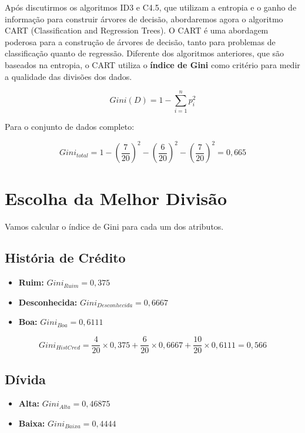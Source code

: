 \documentclass[a4paper,12pt]{article}
\begin{document}
Após discutirmos os algoritmos ID3 e C4.5, que utilizam a entropia e o ganho de informação para construir árvores de decisão, abordaremos agora o algoritmo CART (Classification and Regression Trees). O CART é uma abordagem poderosa para a construção de árvores de decisão, tanto para problemas de classificação quanto de regressão. Diferente dos algoritmos anteriores, que são baseados na entropia, o CART utiliza o \textbf{índice de Gini} como critério para medir a qualidade das divisões dos dados.


\begin{equation}
Gini(D) = 1 - \sum_{i=1}^{n} p_i^2
\end{equation}

Para o conjunto de dados completo:

\[
Gini_{total} = 1 - \left(\frac{7}{20}\right)^2 - \left(\frac{6}{20}\right)^2 - \left(\frac{7}{20}\right)^2 = 0,665
\]

\section{Escolha da Melhor Divisão}

Vamos calcular o índice de Gini para cada um dos atributos.

\subsection{História de Crédito}
\begin{itemize}
    \item \textbf{Ruim:} \(Gini_{Ruim} = 0,375\)
    \item \textbf{Desconhecida:} \(Gini_{Desconhecida} = 0,6667\)
    \item \textbf{Boa:} \(Gini_{Boa} = 0,6111\)
\end{itemize}

\[
Gini_{HistCred} = \frac{4}{20} \times 0,375 + \frac{6}{20} \times 0,6667 + \frac{10}{20} \times 0,6111 = 0,566
\]

\subsection{Dívida}
\begin{itemize}
    \item \textbf{Alta:} \(Gini_{Alta} = 0,46875\)
    \item \textbf{Baixa:} \(Gini_{Baixa} = 0,4444\)
\end{itemize}
\end{document}
